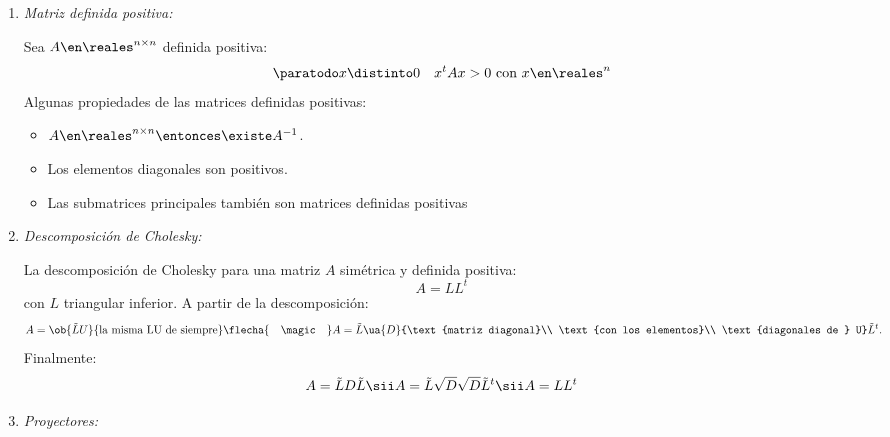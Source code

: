 \begin{enumerate}[label=\tiny\purple{\faIcon{snowman}}]
  \item \hypertarget{teoria-3:definida-positiva}{\textit{Matriz definida positiva:}}

        Sea  $A \en \reales^{n \times n}$ definida positiva:
        $$
          \paratodo x \distinto 0 \quad x^t A x > 0 \text{ con } x \en \reales^n
        $$
        Algunas propiedades de las matrices definidas positivas:
        \begin{itemize}
          \item  $A\en \reales^{n \times n} \entonces \existe A^{-1}$.
          \item  Los elementos diagonales son positivos.
          \item  Las submatrices principales también son matrices definidas positivas
        \end{itemize}

  \item \hypertarget{teoría-3:cholesky}{\textit{Descomposición de Cholesky:}}

        La descomposición de Cholesky para una matriz $A$ simétrica y definida positiva:
        $$
          A = L L^t
        $$
        con $L$ triangular inferior. A partir de la descomposición:
        $$
          A = \ob{\tilde{L} U}{\text{la misma LU de siempre}}
          \flecha{\quad\magic\quad}
          A = \tilde{L}
          \ua{D}{\text{matriz diagonal}\\ \text{con los elementos}\\ \text{diagonales de } U} \tilde{L}^t
          .
        $$
        Finalmente:
        $$
          A = \tilde{L} D \tilde{L}
          \sii
          A = \tilde{L} \sqrt{D} \sqrt{D} \tilde{L}^t
          \sii
          A = LL^t
        $$

  \item \hypertarget{teoria-3:proyector}{\textit{Proyectores:}}


\end{enumerate}

